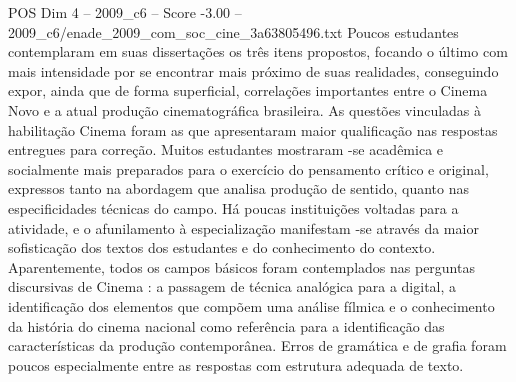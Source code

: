 \begin{textsample}{POS Dim 4 – 2009\_c6 – Score -3.00 – 2009\_c6/enade\_2009\_com\_soc\_cine\_3a63805496.txt}
Poucos estudantes contemplaram em suas dissertações os três itens propostos, focando o último com mais intensidade por se encontrar mais próximo de suas realidades, conseguindo expor, ainda que de forma superficial, correlações importantes entre o Cinema Novo e a atual produção cinematográfica brasileira.
As questões vinculadas à habilitação Cinema foram as que apresentaram maior qualificação nas respostas entregues para correção.
Muitos estudantes mostraram -se acadêmica e socialmente mais preparados para o exercício do pensamento crítico e original, expressos tanto na abordagem que analisa produção de sentido, quanto nas especificidades técnicas do campo.
Há poucas instituições voltadas para a atividade, e o afunilamento à especialização manifestam -se através da maior sofisticação dos textos dos estudantes e do conhecimento do contexto.
Aparentemente, todos os campos básicos foram contemplados nas perguntas discursivas de Cinema : a passagem de técnica analógica para a digital, a identificação dos elementos que compõem uma análise fílmica e o conhecimento da história do cinema nacional como referência para a identificação das características da produção contemporânea.
Erros de gramática e de grafia foram poucos especialmente entre as respostas com estrutura adequada de texto.

\end{textsample}
